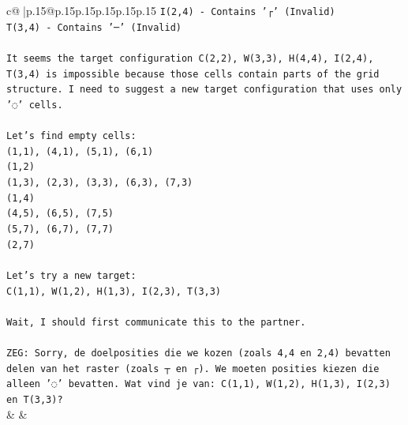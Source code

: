 \documentclass{article}
\begin{document}
{\begin{supertabular}{c@{$\;$}|p{.15\linewidth}@{}p{.15\linewidth}p{.15\linewidth}p{.15\linewidth}p{.15\linewidth}p{.15\linewidth}}
{{{\texttt{I(2,4) {-} Contains '┌' (Invalid)} \\
\texttt{T(3,4) {-} Contains '─' (Invalid)} \\
\\ 
\texttt{It seems the target configuration C(2,2), W(3,3), H(4,4), I(2,4), T(3,4) is impossible because those cells contain parts of the grid structure. I need to suggest a new target configuration that uses only '◌' cells.} \\
\\ 
\texttt{Let's find empty cells:} \\
\texttt{(1,1), (4,1), (5,1), (6,1)} \\
\texttt{(1,2)} \\
\texttt{(1,3), (2,3), (3,3), (6,3), (7,3)} \\
\texttt{(1,4)} \\
\texttt{(4,5), (6,5), (7,5)} \\
\texttt{(5,7), (6,7), (7,7)} \\
\texttt{(2,7)} \\
\\ 
\texttt{Let's try a new target:} \\
\texttt{C(1,1), W(1,2), H(1,3), I(2,3), T(3,3)} \\
\\ 
\texttt{Wait, I should first communicate this to the partner.} \\
\\ 
\texttt{ZEG: Sorry, de doelposities die we kozen (zoals 4,4 en 2,4) bevatten delen van het raster (zoals ┬ en ┌). We moeten posities kiezen die alleen '◌' bevatten. Wat vind je van: C(1,1), W(1,2), H(1,3), I(2,3) en T(3,3)?} \\
            }
        }
    }
    & & \\ \\


\end{supertabular}}
\end{document}

